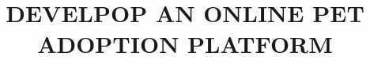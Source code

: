 \documentclass[12pt,a4paper,oneside]{book} %
\title{DEVELPOP AN ONLINE PET ADOPTION PLATFORM}
\begin{document}

\coverpage

\frontmatter

\begin{acknowledgment}
	
\end{acknowledgment}


\begin{commitment}
	
\end{commitment}


\begin{abstract}
	
\end{abstract}

\tableofcontents
\listoftables


\listoffigures


\mainmatter

\fancyhead{}  %
\renewcommand{\footrulewidth}{0.4pt}

\pagestyle{fancy}  %















% 


\end{document}
